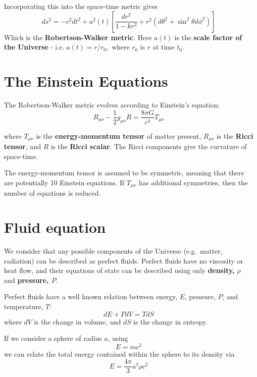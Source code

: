 \documentclass[11pt,a4paper]{book}
\begin{document}
Incorporating this into the space-time metric gives
\begin{equation}
ds^2 = -c^2 dt^2 + a^2(t) \left[\dfrac{dr^2}{1 - kr^2} + r^2\left(d\theta^2 + \sin^2\theta d\phi^2\right)\right]
\label{eq:rw-metric}
\end{equation}
Which is the \textbf{Robertson-Walker metric}. Here \(a(t)\) is the \textbf{scale
factor of the Universe} - i.e. \(a(t) = r/r_0,\) where \(r_0\) is \(r\) at
time \(t_0\).

\hypertarget{sec:einstein_eqs}{%
\section{The Einstein Equations}\label{sec:einstein_eqs}}

The Robertson-Walker metric evolves according to Einstein's equation:
\begin{equation}
R_{\mu\nu} - \dfrac{1}{2}g_{\mu\nu}R = \dfrac{8\pi G}{c^4} T_{\mu\nu}
\label{eq:einstein}
\end{equation}

where \({T_{\mu\nu}}\) is the \textbf{energy-momentum tensor} of matter
present, \({R_{\mu\nu}}\) is the \textbf{Ricci tensor}, and \({R}\)
is the \textbf{Ricci scalar}. The Ricci components give the curvature of
space-time.

The energy-momentum tensor is assumed to be symmetric, meaning that
there are potentially 10 Einstein equations. If \(T_{\mu\nu}\) has
additional symmetries, then the number of equations is reduced.

\hypertarget{sec:fluid-eqns}{%
\section{Fluid equation}\label{sec:fluid-eqns}}

We consider that any possible components of the Universe (e.g.~matter,
radiation) can be described as perfect fluids. Perfect fluids have no
viscosity or heat flow, and their equations of state can be described
using only \textbf{density, \(\rho\)} and \textbf{pressure, \(P\)}.

Perfect fluids have a well known relation between energy, \(E\), pressure,
\(P\), and temperature, \(T\):
\begin{equation}
dE + PdV = TdS
\label{eq:de}
\end{equation}
where \(dV\) is the change in volume, and \(dS\) is the
change in entropy.

If we consider a sphere of radius \(a\), using
\begin{equation}
E = mc^2
\label{eq:emc2}
\end{equation}
we can relate
the total energy contained within the sphere to its density via
\begin{equation}
E = \dfrac{4\pi}{3}a^3\rho c^2
\label{eq:e-rho}
\end{equation}
\end{document}
